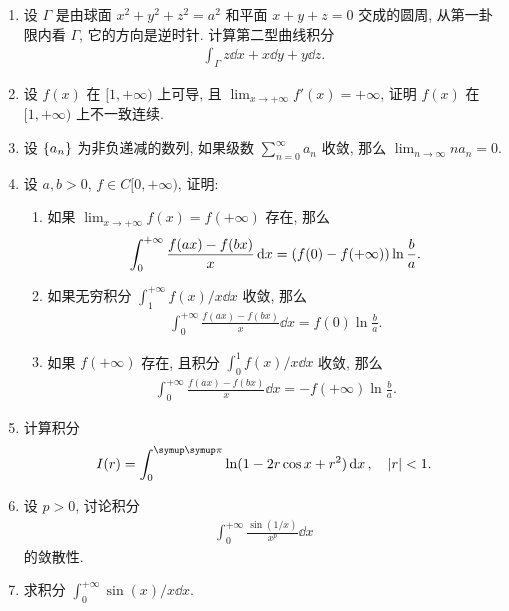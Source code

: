 \documentclass{ctexart}
\let\umathpi\pi
\renewcommand\pi{\symup\umathpi}%
\let\set\qty
\newcommand{\limit}[2]{\lim_{#1 \to #2}}
\begin{document}
\begin{enumerate}[series=exer]
    \item 设 $ \Gamma $ 是由球面 $ x^{2} + y^{2} + z^{2} = a^{2} $ 和平面 $ x + y + z = 0 $ 交成的圆周, 从第一卦限内看 $ \Gamma $, 它的方向是逆时针. 计算第二型曲线积分
    \begin{align*}
        \int_{\Gamma} z \dd{x} + x \dd{y} + y \dd{z}.
    \end{align*}
    \item 设 $ f(x) $ 在 $ [1, +\infty) $ 上可导, 且 $ \limit{x}{+\infty}f'(x) = +\infty $, 证明 $ f(x) $ 在 $ [1, +\infty) $ 上不一致连续.
    \item 设 $ \set{a_{n}} $ 为非负递减的数列, 如果级数 $ \sum_{n=0}^{\infty}a_{n} $ 收敛, 那么 $ \limit{n}{\infty} na_{n} = 0 $. 
    \item 设 $ a, b > 0 $, $ f \in C[0, +\infty) $, 证明:
    \begin{enumerate}
        \item  如果 $ \limit{x}{+\infty}f(x) = f(+\infty) $ 存在, 那么
        \begin{align*}
            \int_{0}^{+\infty} \frac{f(ax) - f(bx)}{x} \dd{x} = \qty(f(0) - f(+\infty))\ln\frac{b}{a}.
        \end{align*}
        \item 如果无穷积分 $ \int_{1}^{+\infty} f(x)/x \dd{x} $ 收敛, 那么
        \begin{align*}
            \int_{0}^{+\infty} \frac{f(ax) - f(bx)}{x} \dd{x} = f(0)\ln\frac{b}{a}.
        \end{align*}
        \item 如果 $ f(+\infty) $ 存在, 且积分 $ \int_{0}^{1} f(x)/x \dd{x} $ 收敛, 那么
        \begin{align*}
            \int_{0}^{+\infty} \frac{f(ax) - f(bx)}{x} \dd{x} = - f(+\infty)\ln\frac{b}{a}.
        \end{align*}
    \end{enumerate}
    \item 计算积分
    \begin{align*}
        I(r) = \int_{0}^{\pi} \ln(1 - 2 r \cos x + r^{2}) \dd{x}, \quad \abs{r} <1.
    \end{align*}
    \item 设 $ p > 0 $, 讨论积分
    \begin{align*}
        \int_{0}^{+\infty} \frac{\sin(1/x)}{x^{p}} \dd{x}
    \end{align*}
    的敛散性. 
    \item 求积分 $ \int_{0}^{+\infty} \sin(x)/x \dd{x} $.

\end{enumerate}
\end{document}
